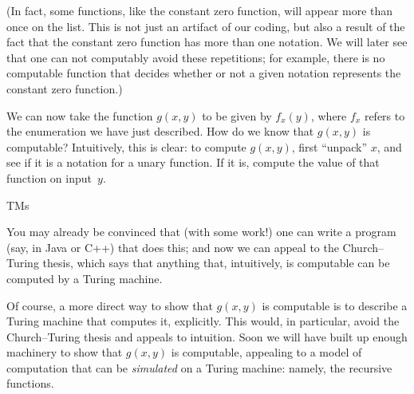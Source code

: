 \documentclass[../../../include/open-logic-section]{subfiles}
\begin{document}
(In fact, some functions, like the constant zero function, will appear
more than once on the list. This is not just an artifact of our
coding, but also a result of the fact that the constant zero function has
more than one notation. We will later see that one can not computably
avoid these repetitions; for example, there is no computable function
that decides whether or not a given notation represents the constant
zero function.)

We can now take the function $g(x,y)$ to be given by $f_x(y)$, where
$f_x$ refers to the enumeration we have just described. How do we know
that $g(x,y)$ is computable? Intuitively, this is clear: to compute
$g(x,y)$, first ``unpack'' $x$, and see if it is a notation for a unary
function. If it is, compute the value of that function on input~$y$.

\begin{tagblock}{TMs}
\begin{digress}
You may already be convinced that (with some work!) one can write a
program (say, in Java or C++) that does this; and now we can appeal to
the Church--Turing thesis, which says that anything that, intuitively,
is computable can be computed by a Turing machine.

Of course, a more direct way to show that $g(x,y)$ is computable is to
describe a Turing machine that computes it, explicitly. This would,
in particular, avoid the Church--Turing thesis and appeals to
intuition. Soon we will have built up enough machinery to show
that $g(x,y)$ is computable, appealing to a model of computation that
can be \emph{simulated} on a Turing machine: namely, the recursive
functions.
\end{digress}
\end{tagblock}
\end{document}
